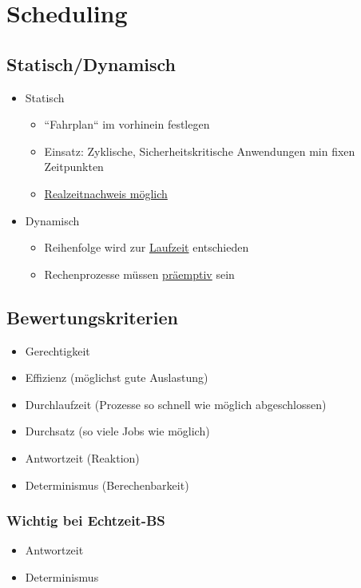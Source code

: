 \section{Scheduling}
\subsection{Statisch/Dynamisch}
\begin{itemize}
	\item Statisch
	\begin{itemize}
		\item ``Fahrplan`` im vorhinein festlegen
		\item Einsatz: Zyklische, Sicherheitskritische Anwendungen min fixen Zeitpunkten
		\item \underline{Realzeitnachweis möglich}
	\end{itemize}
	
	\item Dynamisch
	\begin{itemize}
		\item Reihenfolge wird zur \underline{Laufzeit} entschieden
		\item Rechenprozesse müssen \underline{präemptiv} sein
	\end{itemize}
\end{itemize}

\subsection{Bewertungskriterien}
\begin{itemize}
	\item Gerechtigkeit
	\item Effizienz (möglichst gute Auslastung)
	\item Durchlaufzeit (Prozesse so schnell wie möglich abgeschlossen)
	\item Durchsatz (so viele Jobs wie möglich)
	\item Antwortzeit (Reaktion)
	\item Determinismus (Berechenbarkeit)
\end{itemize}
\subsubsection{Wichtig bei Echtzeit-BS}
\begin{itemize}
	\item Antwortzeit
	\item Determinismus
\end{itemize}

